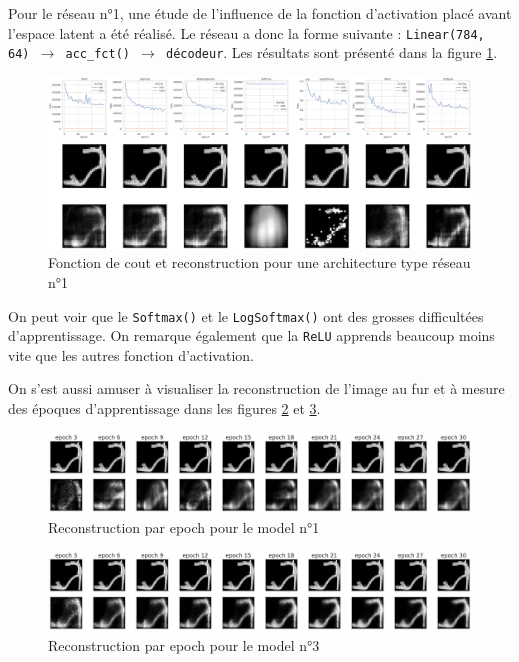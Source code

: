 \documentclass{article}
\begin{document}
Pour le réseau n°1, une étude de l'influence de la fonction d'activation placé avant l'espace latent a été réalisé. Le réseau a donc la forme suivante : \texttt{Linear(784, 64) $\rightarrow$ acc\_fct() $\rightarrow$ décodeur}. Les résultats sont présenté dans la figure \ref*{fig:accfct}. 

\begin{figure}[htbp]
    \centering
    \includegraphics*[width=\textwidth]{encoder_decoder_middle_func_simple_net.pdf}
    \caption{Fonction de cout et reconstruction pour une architecture type réseau n°1}
    \label{fig:accfct}
\end{figure}

On peut voir que le \texttt{Softmax()} et le \texttt{LogSoftmax()} ont des grosses difficultées d'apprentissage. On remarque également que la \texttt{ReLU} apprends beaucoup moins vite que les autres fonction d'activation. 

On s'est aussi amuser à visualiser la reconstruction de l'image au fur et à mesure des époques d'apprentissage dans les figures \ref*{fig:perEpochSimple} et \ref*{fig:perEpochBig}.

\begin{figure}[htbp]
    \centering
    \includegraphics*[width=\textwidth]{reconstruction_per_epoch_simple_model.pdf}
    \caption{Reconstruction par epoch pour le model n°1}
    \label{fig:perEpochSimple}
\end{figure}

\begin{figure}[htbp]
    \centering
    \includegraphics*[width=\textwidth]{reconstruction_per_epoch_big_model.pdf}
    \caption{Reconstruction par epoch pour le model n°3}
    \label{fig:perEpochBig}
\end{figure}
\end{document}

